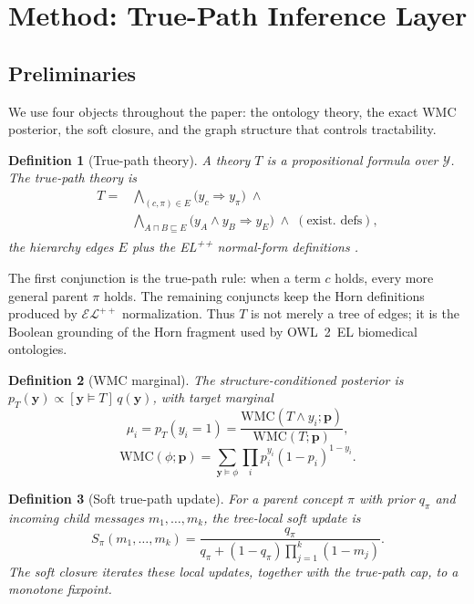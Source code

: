 \documentclass[letterpaper]{article}
\newcommand{\WMC}{\ensuremath{\mathrm{WMC}}}
\newcommand{\bC}[1]{\boldsymbol{#1}}
\newtheorem{definition}{Definition}
\begin{document}
\section{Method: True-Path Inference Layer}\label{sec:setup}

\subsection{Preliminaries}\label{sec:prelim}
We use four objects throughout the paper: the ontology theory, the exact WMC posterior, the soft closure, and the graph structure that controls tractability.

\begin{definition}[True-path theory]\label{def:truepath}
A theory $T$ is a propositional formula over $\mathcal Y$. The \emph{true-path} theory is
\begin{equation*}
\begin{aligned}
T={}&\bigwedge_{(c,\pi)\in E}\bigl(y_c\!\Rightarrow\!y_\pi\bigr)\;\wedge\\
&\bigwedge_{A\sqcap B\sqsubseteq E}\bigl(y_A\wedge y_B\!\Rightarrow\!y_E\bigr)\;\wedge\;(\text{exist.\ defs}),
\end{aligned}
\end{equation*}
the hierarchy edges $E$ plus the EL\textsuperscript{++} normal-form definitions
\citep{baader2005elenvelope,kazakov2014elk}.
\end{definition}

The first conjunction is the true-path rule: when a term $c$ holds, every more general parent $\pi$ holds. The remaining conjuncts keep the Horn definitions produced by $\mathcal{EL}^{++}$ normalization. Thus $T$ is not merely a tree of edges; it is the Boolean grounding of the Horn fragment used by OWL~2~EL biomedical ontologies.

\begin{definition}[WMC marginal]\label{def:wmc}
The structure-conditioned posterior is $p_T(\bC y)\propto[\bC y\models T]\,q(\bC y)$, with target
marginal
\begin{equation*}
\mu_i=p_T(y_i{=}1)=\frac{\WMC(T\wedge y_i;\bC p)}{\WMC(T;\bC p)},
\end{equation*}
\begin{equation*}
\WMC(\phi;\bC p)=\sum_{\bC y\models\phi}\prod_i p_i^{y_i}(1-p_i)^{1-y_i}.
\end{equation*}
\end{definition}

\begin{definition}[Soft true-path update]\label{def:soft}
For a parent concept $\pi$ with prior $q_\pi$ and incoming child messages $m_1,\dots,m_k$, the tree-local soft update is
\[
S_\pi(m_1,\dots,m_k)=
\frac{q_\pi}{q_\pi+(1-q_\pi)\prod_{j=1}^{k}(1-m_j)}.
\]
The \emph{soft closure} iterates these local updates, together with the true-path cap, to a monotone fixpoint.
\end{definition}
\end{document}

